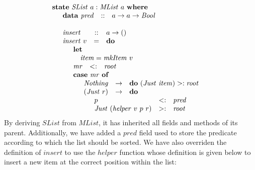\documentclass[runningheads,a4paper]{llncs}
\begin{document}
\begin{displaymath}
\begin{array}{l}
\mathbf{state}~\mathit{SList}~a : \mathit{MList}~a~\mathbf{where} \\
\quad \begin{array}{lcl}
\mathbf{data}~\mathit{pred}  & :: & a \to a \to \mathit{Bool}
\end{array}\\\\
\quad \begin{array}{lcl}
\mathit{insert} & :: & a \to ()\\
\mathit{insert}~v & = & \mathbf{do} \\
\multicolumn{3}{l}{\quad \begin{array}{lcl}
\multicolumn{3}{l}{\mathbf{let}}\\
\multicolumn{3}{l}{\quad \mathit{item} = \mathit{mkItem}~v} \\
\mathit{mr} & <: & \mathit{root} \\
\multicolumn{3}{l}{\mathbf{case}~\mathit{mr}~\mathbf{of}} \\
\multicolumn{3}{l}{\quad \begin{array}{lcl}
\mathit{Nothing} & \to & \mathbf{do}~(\mathit{Just}~\mathit{item}) >: \mathit{root} \\
(\mathit{Just}~r) & \to & \mathbf{do} \\
\multicolumn{3}{l}{\quad \begin{array}{lcl}
p & <: & \mathit{pred} \\
\mathit{Just}~(\mathit{helper}~v~p~r) & >: & \mathit{root}
\end{array}}
\end{array}}
\end{array}}
\end{array}
\end{array}
\end{displaymath}
By deriving $\mathit{SList}$ from $\mathit{MList}$, it has inherited all fields and methods of its parent. Additionally, we have added a $\mathit{pred}$ field used to store the predicate according to which the list should be sorted. We have also overriden the definition of $\mathit{insert}$ to use the $\mathit{helper}$ function whose definition is given below to insert a new item at the correct position within the list:
\end{document}
